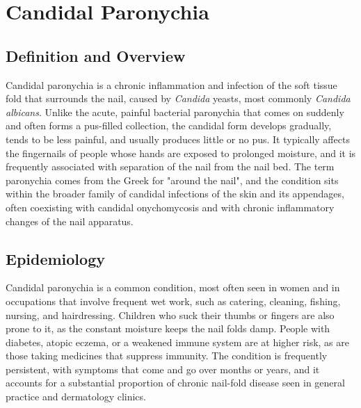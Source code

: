 \chapter{Candidal Paronychia}

\section*{Definition and Overview}
Candidal paronychia is a chronic inflammation and infection of the soft tissue fold that surrounds the nail, caused by \textit{Candida} yeasts, most commonly \textit{Candida albicans}. Unlike the acute, painful bacterial paronychia that comes on suddenly and often forms a pus-filled collection, the candidal form develops gradually, tends to be less painful, and usually produces little or no pus. It typically affects the fingernails of people whose hands are exposed to prolonged moisture, and it is frequently associated with separation of the nail from the nail bed. The term paronychia comes from the Greek for "around the nail", and the condition sits within the broader family of candidal infections of the skin and its appendages, often coexisting with candidal onychomycosis and with chronic inflammatory changes of the nail apparatus.

\section*{Epidemiology}
Candidal paronychia is a common condition, most often seen in women and in occupations that involve frequent wet work, such as catering, cleaning, fishing, nursing, and hairdressing. Children who suck their thumbs or fingers are also prone to it, as the constant moisture keeps the nail folds damp. People with diabetes, atopic eczema, or a weakened immune system are at higher risk, as are those taking medicines that suppress immunity. The condition is frequently persistent, with symptoms that come and go over months or years, and it accounts for a substantial proportion of chronic nail-fold disease seen in general practice and dermatology clinics.

